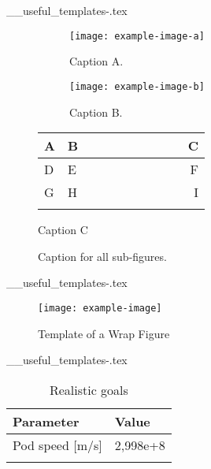 \begin{filecontents*}{__useful_templates-\theusefultemplate.tex}
\begin{figure}[tph]
    \centering
    \begin{subfigure}{0.3\textwidth}
    \centering
    \texttt{[image: example-image-a]} %
    \caption{Caption A.}            %
    \label{subfig:subfig-example-a} %
    \end{subfigure}
    \hfill
    \begin{subfigure}{0.3\textwidth}
    \centering
    \texttt{[image: example-image-b]}
    \caption{Caption B.}
    \label{subfig:subfig-example-b}
    \end{subfigure}
    \hfill 
    \begin{subtable}[b]{0.3\textwidth}
        \begin{tabular}{L{0.1\linewidth} C{0.4\linewidth} r}
        \hhline{===} 
        \textbf{A} & \textbf{B} & \textbf{C}   \\ \hline 
        D & E & F   \\
        G & H & I   \\
        \hhline{===}
        \end{tabular}
        \caption{Caption C}
      \label{table:table}
  \end{subtable}
\caption{Caption for all sub-figures.}  %
\label{fig:subfig-example}              %
\end{figure}
\end{filecontents*}

\begin{filecontents*}{__useful_templates-\theusefultemplate.tex}
\begin{wrapfigure}{r}{0.4\linewidth}
    \centering
    \texttt{[image: example-image]}
    \caption{Template of a Wrap Figure}
    \label{fig:descriptive-label}
\end{wrapfigure}

\lipsum[1]
\end{filecontents*}


\begin{filecontents*}{__useful_templates-\theusefultemplate.tex}
\begin{table}[h]
    \centering
    \begin{tabular}{ll}
        \hhline{==} %
        \textbf{Parameter} & \textbf{Value} \\
        \hline
        Pod speed [m/s] & 2,998e+8 \\
        \hhline{==}
    \end{tabular}

    \caption{Realistic goals}
    \label{table:table}
\end{table}
\end{filecontents*}

